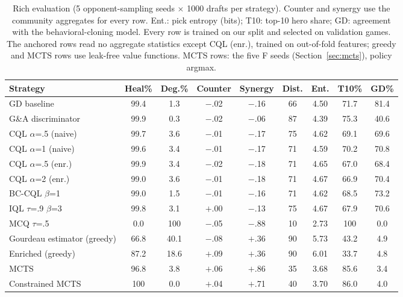\documentclass[journal]{IEEEtran}
\begin{document}
\begin{table}[t]
\centering
\caption{Rich evaluation (5 opponent-sampling seeds $\times$ 1000 drafts per strategy). Counter and synergy use the community aggregates for every row. Ent.: pick entropy (bits); T10: top-10 hero share; GD: agreement with the behavioral-cloning model. Every row is trained on our split and selected on validation games. The anchored rows read no aggregate statistics except CQL (enr.), trained on out-of-fold features; greedy and MCTS rows use leak-free value functions. MCTS rows: the five F seeds (Section~\ref{sec:mcts}), policy argmax.}
\label{tab:rich}
\begin{tabular}{lcccccccc}
\toprule
Strategy & Heal\% & Deg.\% & Counter & Synergy & Dist. & Ent. & T10\% & GD\% \\
\midrule
GD baseline & 99.4 & 1.3 & $-$.02 & $-$.16 & 66 & 4.50 & 71.7 & 81.4 \\
G\&A discriminator & 99.9 & 0.3 & $-$.02 & $-$.06 & 87 & 4.39 & 75.3 & 40.6 \\
CQL $\alpha$=.5 (naive) & 99.7 & 3.6 & $-$.01 & $-$.17 & 75 & 4.62 & 69.1 & 69.6 \\
CQL $\alpha$=1 (naive) & 99.6 & 3.4 & $-$.01 & $-$.17 & 71 & 4.59 & 70.2 & 70.8 \\
CQL $\alpha$=.5 (enr.) & 99.9 & 3.4 & $-$.02 & $-$.18 & 71 & 4.65 & 67.0 & 68.4 \\
CQL $\alpha$=2 (enr.) & 99.0 & 3.6 & $-$.01 & $-$.18 & 71 & 4.67 & 66.9 & 70.4 \\
BC-CQL $\beta$=1 & 99.0 & 1.5 & $-$.01 & $-$.16 & 71 & 4.62 & 68.5 & 73.2 \\
IQL $\tau$=.9 $\beta$=3 & 99.8 & 3.1 & $+$.00 & $-$.13 & 75 & 4.67 & 67.9 & 70.6 \\
MCQ $\tau$=.5 & 0.0 & 100 & $-$.05 & $-$.88 & 10 & 2.73 & 100 & 0.0 \\
\midrule
Gourdeau estimator (greedy) & 66.8 & 40.1 & $-$.08 & $+$.36 & 90 & 5.73 & 43.2 & 4.9 \\
Enriched (greedy) & 87.2 & 18.6 & $+$.09 & $+$.36 & 90 & 6.01 & 33.7 & 4.8 \\
MCTS & 96.8 & 3.8 & $+$.06 & $+$.86 & 35 & 3.68 & 85.6 & 3.4 \\
Constrained MCTS & 100 & 0.0 & $+$.04 & $+$.71 & 40 & 3.70 & 86.0 & 4.0 \\
\bottomrule
\end{tabular}
\end{table}
\end{document}
